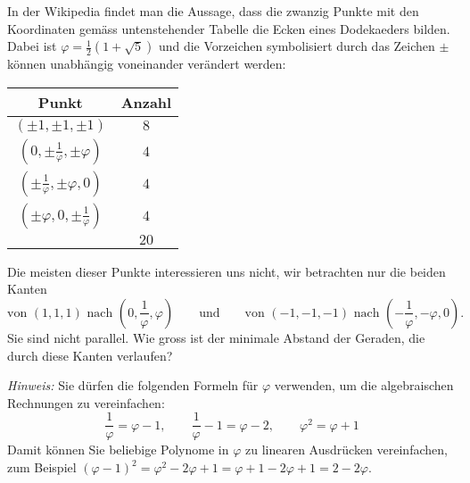 In der Wikipedia findet man die Aussage, dass die zwanzig Punkte mit
den Koordinaten gemäss untenstehender Tabelle die Ecken eines
Dodekaeders bilden. Dabei ist
$\varphi=\frac12(1+\sqrt{5})$ und die Vorzeichen symbolisiert durch
das Zeichen $\pm$ können unabhängig voneinander verändert werden:
\begin{center}
\begin{tabular}{|c|c|}
\hline
Punkt&Anzahl\\
\hline
$(\pm 1,\pm 1,\pm 1)$&$8$\\
$(0,\pm\frac1{\varphi},\pm\varphi)$&$4$\\
$(\pm\frac1{\varphi},\pm\varphi,0)$&$4$\\
$(\pm\varphi,0,\pm\frac1{\varphi})$&$4$\\
\hline
&$20$\\
\hline
\end{tabular}
\end{center}
Die meisten dieser Punkte interessieren uns nicht, wir betrachten
nur die beiden Kanten
\[
\text{von $(1,1,1)$ nach $(0,\frac1{\varphi},\varphi)$}
\qquad\text{und}\qquad
\text{von $(-1,-1,-1)$ nach $(-\frac1{\varphi},-\varphi,0).$}
\]
Sie sind nicht parallel. Wie gross ist der minimale
Abstand der Geraden, die durch diese Kanten verlaufen?

{\it Hinweis:} Sie dürfen die folgenden Formeln für $\varphi$ verwenden,
um die algebraischen Rechnungen zu vereinfachen:
\[
\frac1{\varphi}=\varphi-1,\qquad
\frac1{\varphi}-1=\varphi-2,\qquad
\varphi^2=\varphi+1
\]
Damit können Sie beliebige Polynome in $\varphi$ zu linearen Ausdrücken
vereinfachen, zum Beispiel $(\varphi-1)^2=\varphi^2-2\varphi+1=\varphi+1-2\varphi+1=2-2\varphi$.

